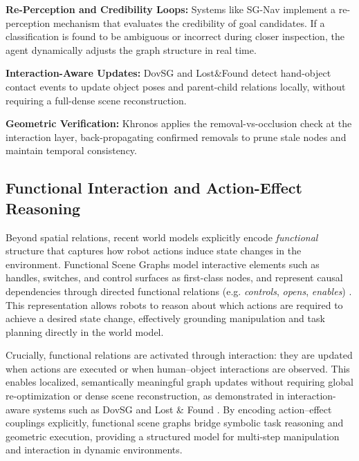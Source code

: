 \noindent\textbf{Re-Perception and Credibility Loops:} Systems like SG-Nav \cite{yin2024sgnav} implement a re-perception mechanism that evaluates the credibility of goal candidates. 
If a classification is found to be ambiguous or incorrect during closer inspection, the agent dynamically adjusts the graph structure in real time.

\noindent\textbf{Interaction-Aware Updates:} DovSG \cite{yan_dynamic_2025} and Lost\&Found\cite{behrens_lost_2025} detect hand-object contact events to update object poses and parent-child relations locally, without requiring a full-dense scene reconstruction. 

\noindent\textbf{Geometric Verification:} %
Khronos \cite{schmid_khronos_2024} applies the removal-vs-occlusion check at the interaction layer, back-propagating confirmed removals to prune stale nodes and maintain temporal consistency.

\subsection{Functional Interaction and Action-Effect Reasoning}\label{sec:querying_reasoning_action_interaction}
Beyond spatial relations, recent world models explicitly encode \textit{functional} structure that captures how robot actions induce state changes in the environment.
Functional Scene Graphs model interactive elements such as handles, switches, and control surfaces as first-class nodes, and represent causal dependencies through directed functional relations (e.g. \textit{controls}, \textit{opens}, \textit{enables}) \cite{zhang_open-vocabulary_2025} \cite{rotondi_fungraph_2025}. 
This representation allows robots to reason about which actions are required to achieve a desired state change, effectively grounding manipulation and task planning directly in the world model.

Crucially, functional relations are activated through interaction: they are updated when actions are executed or when human–object interactions are observed. 
This enables localized, semantically meaningful graph updates without requiring global re-optimization or dense scene reconstruction, as demonstrated in interaction-aware systems such as DovSG \cite{yan_dynamic_2025} and Lost \& Found \cite{behrens_lost_2025}. 
By encoding action–effect couplings explicitly, functional scene graphs bridge symbolic task reasoning and geometric execution, providing a structured model for multi-step manipulation and interaction in dynamic environments.



